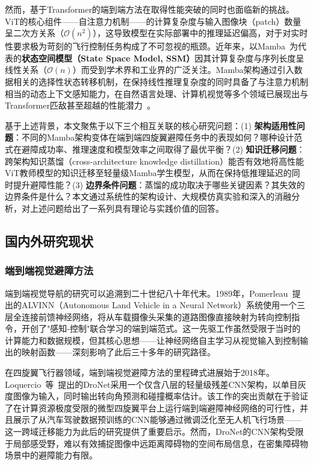 \documentclass[12pt,a4paper]{article}
\numberwithin{equation}{section}
\numberwithin{figure}{section}
\numberwithin{table}{section}
\begin{document}
然而，基于Transformer的端到端方法在取得性能突破的同时也面临新的挑战。ViT的核心组件——自注意力机制——的计算复杂度与输入图像块（patch）数量呈二次方关系（$\mathcal{O}(n^2)$），这导致模型在实际部署中的推理延迟偏高，对于对实时性要求极为苛刻的飞行控制任务构成了不可忽视的瓶颈。近年来，以Mamba~\cite{gu2023mamba}为代表的\textbf{状态空间模型（State Space Model, SSM）}因其计算复杂度与序列长度呈线性关系（$\mathcal{O}(n)$）而受到学术界和工业界的广泛关注。Mamba架构通过引入数据相关的选择性状态转移机制，在保持线性推理复杂度的同时具备了与注意力机制相当的动态上下文感知能力，在自然语言处理、计算机视觉等多个领域已展现出与Transformer匹敌甚至超越的性能潜力~\cite{liu2024vmamba,hatamizadeh2024mambavision}。

基于上述背景，本文聚焦于以下三个相互关联的核心研究问题：(1) \textbf{架构适用性问题}：不同的Mamba架构变体在端到端四旋翼避障任务中的表现如何？哪种设计范式在避障成功率、推理速度和模型效率之间取得了最优平衡？(2) \textbf{知识迁移问题}：跨架构知识蒸馏（cross-architecture knowledge distillation）能否有效地将高性能ViT教师模型的知识迁移至轻量级Mamba学生模型，从而在保持低推理延迟的同时提升避障性能？(3) \textbf{边界条件问题}：蒸馏的成功取决于哪些关键因素？其失效的边界条件是什么？本文通过系统性的架构设计、大规模仿真实验和深入的消融分析，对上述问题给出了一系列具有理论与实践价值的回答。

\subsection{国内外研究现状}
\label{sec:related}

\subsubsection{端到端视觉避障方法}

端到端视觉导航的研究可以追溯到二十世纪八十年代末。1989年，Pomerleau~\cite{pomerleau1989alvinn}提出的ALVINN（Autonomous Land Vehicle in a Neural Network）系统使用一个三层全连接前馈神经网络，将从车载摄像头采集的道路图像直接映射为转向控制指令，开创了"感知-控制"联合学习的端到端范式。这一先驱工作虽然受限于当时的计算能力和数据规模，但其核心思想——让神经网络自主学习从视觉输入到控制输出的映射函数——深刻影响了此后三十多年的研究路径。

在四旋翼飞行器领域，端到端视觉避障方法的里程碑式进展始于2018年。Loquercio~等~\cite{loquercio2018dronet}提出的DroNet采用一个仅含八层的轻量级残差CNN架构，以单目灰度图像为输入，同时输出转向角预测和碰撞概率估计。该工作的突出贡献在于验证了在计算资源极度受限的微型四旋翼平台上运行端到端避障神经网络的可行性，并且展示了从汽车驾驶数据预训练的CNN能够通过微调泛化至无人机飞行场景——这一跨域迁移能力为此后的研究提供了重要启示。然而，DroNet的CNN架构受限于局部感受野，难以有效捕捉图像中远距离障碍物的空间布局信息，在密集障碍物场景中的避障能力有限。
\end{document}
